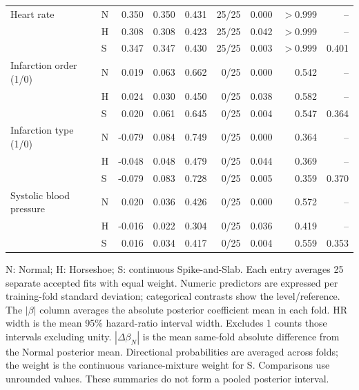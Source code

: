 \begin{longtable}{@{}>{\raggedright\arraybackslash}p{}lrrrrrrr@{}}
Heart rate & N & 0.350 & 0.350 & 0.431 & 25/25 & 0.000 & $>0.999$ & --\\*
 & H & 0.308 & 0.308 & 0.423 & 25/25 & 0.042 & $>0.999$ & --\\*
 & S & 0.347 & 0.347 & 0.430 & 25/25 & 0.003 & $>0.999$ & 0.401\\[2pt]
Infarction order (1/0) & N & 0.019 & 0.063 & 0.662 & 0/25 & 0.000 & 0.542 & --\\*
 & H & 0.024 & 0.030 & 0.450 & 0/25 & 0.038 & 0.582 & --\\*
 & S & 0.020 & 0.061 & 0.645 & 0/25 & 0.004 & 0.547 & 0.364\\[2pt]
Infarction type (1/0) & N & -0.079 & 0.084 & 0.749 & 0/25 & 0.000 & 0.364 & --\\*
 & H & -0.048 & 0.048 & 0.479 & 0/25 & 0.044 & 0.369 & --\\*
 & S & -0.079 & 0.083 & 0.728 & 0/25 & 0.005 & 0.359 & 0.370\\[2pt]
Systolic blood pressure & N & 0.020 & 0.036 & 0.426 & 0/25 & 0.000 & 0.572 & --\\*
 & H & -0.016 & 0.022 & 0.304 & 0/25 & 0.036 & 0.419 & --\\*
 & S & 0.016 & 0.034 & 0.417 & 0/25 & 0.004 & 0.559 & 0.353\\[2pt]
\end{longtable}
\noindent\begin{minipage}{\textwidth}
N: Normal; H: Horseshoe; S: continuous Spike-and-Slab. Each entry averages 25 separate accepted fits with equal weight. Numeric predictors are expressed per training-fold standard deviation; categorical contrasts show the level/reference. The $|\beta|$ column averages the absolute posterior coefficient mean in each fold. HR width is the mean 95\% hazard-ratio interval width. Excludes 1 counts those intervals excluding unity. $|\Delta\beta_N|$ is the mean same-fold absolute difference from the Normal posterior mean. Directional probabilities are averaged across folds; the weight is the continuous variance-mixture weight for S. Comparisons use unrounded values. These summaries do not form a pooled posterior interval.
\end{minipage}\endgroup
